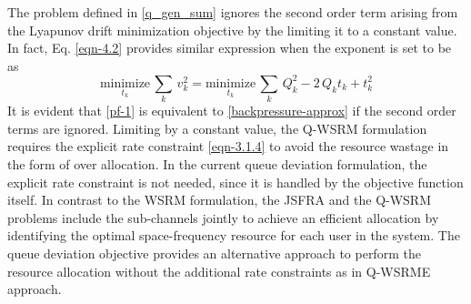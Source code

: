 
The problem defined in \eqref{q_gen_sum} ignores the second order term arising from the Lyapunov drift minimization objective by the limiting it to a constant value. In fact, Eq. \eqref{eqn-4.2} provides similar expression when the exponent is set to be  as
\begin{equation}\label{pf-1}
\underset{t_k}{\text{minimize}} \, \sum_k \, v_k^2 = \underset{t_k}{\text{minimize}} \, \sum_k \, Q_k^2 - 2 \, Q_k t_k + t_k^2
\end{equation}
It is evident that \eqref{pf-1} is equivalent to \eqref{backpressure-approx} if the second order terms are ignored. Limiting  by a constant value, the \ac{Q-WSRM} formulation requires the explicit rate constraint \eqref{eqn-3.1.4} to avoid the resource wastage in the form of over allocation. In the current queue deviation formulation, the explicit rate constraint is not needed, since it is handled by the objective function itself. In contrast to the \ac{WSRM} formulation, the \ac{JSFRA} and the \ac{Q-WSRM} problems include the sub-channels jointly to achieve an efficient allocation by identifying the optimal space-frequency resource for each user in the system. The queue deviation objective provides an alternative approach to perform the resource allocation without the additional rate constraints as in \ac{Q-WSRME} approach.
